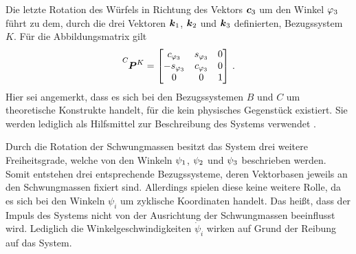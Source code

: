 Die letzte Rotation des Würfels in Richtung des Vektors $\boldsymbol{c}_{\text{3}}$ um den Winkel $\varphi_{\text{3}}$ führt zu dem, durch die drei Vektoren $\boldsymbol{k}_{\text{1}}$, $\boldsymbol{k}_{\text{2}}$ und $\boldsymbol{k}_{\text{3}}$ definierten, Bezugssystem $K$. Für die Abbildungsmatrix gilt 
\begin{equation}
\pMat{C}{K} = \begin{bmatrix}
c_{\varphi\idx3} & s_{\varphi\idx3} & 0 \\ -s_{\varphi\idx3} & c_{\varphi\idx3} & 0 \\ 0 & 0 & 1
\end{bmatrix} \,.
\end{equation}
Hier sei angemerkt, dass es sich bei den Bezugssystemen $B$ und $C$ um theoretische Konstrukte handelt, für die kein physisches Gegenstück existiert. Sie werden lediglich als Hilfsmittel zur Beschreibung des Systems verwendet \cite[S. 24 ff.]{KaneBook}.

Durch die Rotation der Schwungmassen besitzt das System drei weitere Freiheitsgrade, welche von den Winkeln $\psi_{\text{1}}$, $\psi_{\text{2}}$ und $\psi_{\text{3}}$ beschrieben werden. Somit entstehen drei entsprechende Bezugssysteme, deren Vektorbasen jeweils an den Schwungmassen fixiert sind. Allerdings spielen diese keine weitere Rolle, da es sich bei den Winkeln $\psi_i$ um zyklische Koordinaten handelt. Das heißt, dass der Impuls des Systems nicht von der Ausrichtung der Schwungmassen beeinflusst wird. Lediglich die Winkelgeschwindigkeiten $\dot{\psi}_i$ wirken auf Grund der Reibung auf das System.

